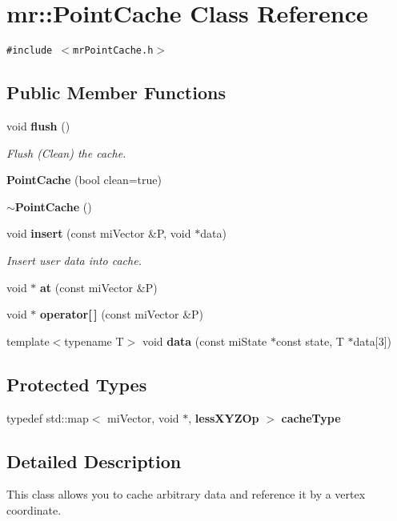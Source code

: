 \section{mr::Point\-Cache Class Reference}
\label{classmr_1_1PointCache}
{\tt \#include $<$mr\-Point\-Cache.h$>$}

\subsection*{Public Member Functions}
\begin{CompactItemize}
\item 
void {\bf flush} ()
\begin{CompactList}\small\item\em Flush (Clean) the cache. \item\end{CompactList}\item 
{\bf Point\-Cache} (bool clean=true)
\item 
{\bf $\sim$Point\-Cache} ()
\item 
void {\bf insert} (const mi\-Vector \&P, void $\ast$data)
\begin{CompactList}\small\item\em Insert user data into cache. \item\end{CompactList}\item 
void $\ast$ {\bf at} (const mi\-Vector \&P)
\item 
void $\ast$ {\bf operator[$\,$]} (const mi\-Vector \&P)
\item 
template$<$typename T$>$ void {\bf data} (const mi\-State $\ast$const state, T $\ast$data[3])
\end{CompactItemize}
\subsection*{Protected Types}
\begin{CompactItemize}
\item 
typedef std::map$<$ mi\-Vector, void $\ast$, {\bf less\-XYZOp} $>$ {\bf cache\-Type}
\end{CompactItemize}


\subsection{Detailed Description}
This class allows you to cache arbitrary data and reference it by a vertex coordinate.

